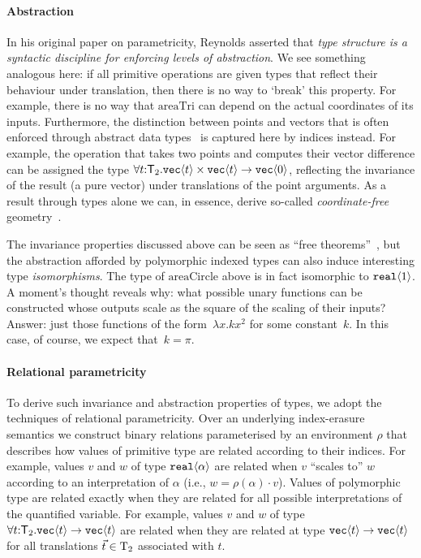 \paragraph{Abstraction}
In his original paper on parametricity, Reynolds asserted that
\emph{type structure is a syntactic discipline for enforcing levels of
  abstraction}.  We see something analogous here: if all primitive
operations are given types that reflect their behaviour under
translation, then there is no way to `break' this property. For
example, there is no way that $\mathrm{areaTri}$ can depend on the
actual coordinates of its inputs. Furthermore, the distinction between
points and vectors that is often enforced through abstract data
types~\cite{CGAL} is captured here by indices instead. For example,
the operation that takes two points and computes their vector
difference can be assigned the type
$\forall t\mathord:\mathsf{T}_2.\textup{\texttt{vec}}\langle t \rangle\times\textup{\texttt{vec}}\langle t \rangle\to\textup{\texttt{vec}}\langle 0 \rangle$,
reflecting the invariance of the result (a pure vector) under
translations of the point arguments. As a result through types alone
we can, in essence, derive so-called \emph{coordinate-free}
geometry~\cite{CFGADT}.

The invariance properties discussed above can be seen as ``free
theorems''~\cite{wadler89theorems}, but the abstraction afforded by
polymorphic indexed types can also induce interesting type
\emph{isomorphisms}.  The type of $\mathrm{areaCircle}$ above is in
fact isomorphic to $\textup{\texttt{real}}\langle 1 \rangle$. A moment's thought reveals why:
what possible unary functions can be constructed whose outputs scale
as the square of the scaling of their inputs?  Answer: just those
functions of the form~$\lambda x. k x^2$ for some constant~$k$.  In
this case, of course, we expect that~$k = \pi$.

\paragraph{Relational parametricity}
To derive such invariance and abstraction properties of types, we
adopt the techniques of relational parametricity. Over an underlying
index-erasure semantics we construct binary relations parameterised by
an environment $\rho$ that describes how values of primitive type are
related according to their indices.  For example, values $v$ and $w$
of type $\textup{\texttt{real}}\langle \alpha \rangle$ are related when $v$ ``scales to'' $w$
according to an interpretation of $\alpha$ (i.e., $w=\rho(\alpha)\cdot
v$).  Values of polymorphic type are related exactly when they are
related for all possible interpretations of the quantified
variable. For example, values $v$ and $w$ of type
$\forall t\mathord:\mathsf{T}_2.\textup{\texttt{vec}}\langle t \rangle\to
\textup{\texttt{vec}}\langle t \rangle$ are related when they are related at type
$\textup{\texttt{vec}}\langle t \rangle\to\textup{\texttt{vec}}\langle t \rangle$ for all translations
$\vec t\in\mathrm{T}_2$ associated with $t$.

